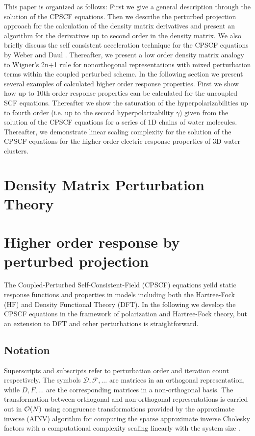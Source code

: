 \documentclass[prl,aps,letterpaper,twocolumn,showpacs,twocolumngrid,superbib]{revtex4}
\begin{document}
This paper is organized as follows: 
 First we give a general description through the solution of the CPSCF equations.
 Then we describe the perturbed projection approach for the calculation
 of the density matrix derivatives and present
 an algorithm for the derivatives up to second order in the density matrix.
 We also briefly discuss the self consistent acceleration technique for the 
 CPSCF equations by Weber and Daul \cite{Weber_2003}.
 Thereafter, we present a low order density matrix analogy to Wigner's 2n+1 rule 
 for nonorthogonal representations with mixed perturbation terms within the
 coupled perturbed scheme.  In the following section we present several examples
 of calculated higher order response properties. First we show how up to 10th
 order response properties can be calculated for the uncoupled SCF equations.
 Thereafter we show the saturation of the hyperpolarizabilities up to 
 fourth order (i.e. up to the second hyperpolarizability $\gamma$) given from
 the solution of the CPSCF equations for a series of 1D chains of water molecules. 
 Thereafter, we demonstrate linear scaling complexity for the solution of the CPSCF
 equations for the higher order electric response properties of 3D water clusters.


\newpage

\section{Density Matrix Perturbation Theory}


\section{Higher order response by perturbed projection}

The Coupled-Perturbed Self-Consistent-Field (CPSCF) equations yeild
static response functions and properties in models including both the 
Hartree-Fock (HF) and Density Functional Theory (DFT).  In the following
we develop the CPSCF equations in the framework of polarization and 
Hartree-Fock theory, but an extension to DFT and other perturbations 
is straightforward.

\subsection{Notation}

Superscripts and subscripts refer to perturbation order and 
iteration count respectively. The symbols $\mathcal{D},\mathcal{F},\dots$
are matrices in an orthogonal representation, while
$D,F,\dots$ are the corresponding matrices in a non-orthogonal basis.
The transformation between orthogonal and non-orthogonal 
representations is carried out in ${\cal O}(N)$ using
congruence transformations \cite{JWilkinson65,GStewart73} provided 
by the approximate inverse (AINV) algorithm for computing the sparse 
approximate inverse Cholesky factors with a computational complexity
scaling linearly with the system size \cite{MBenzi95,MBenzi96,MBenzi01}.
\end{document}
